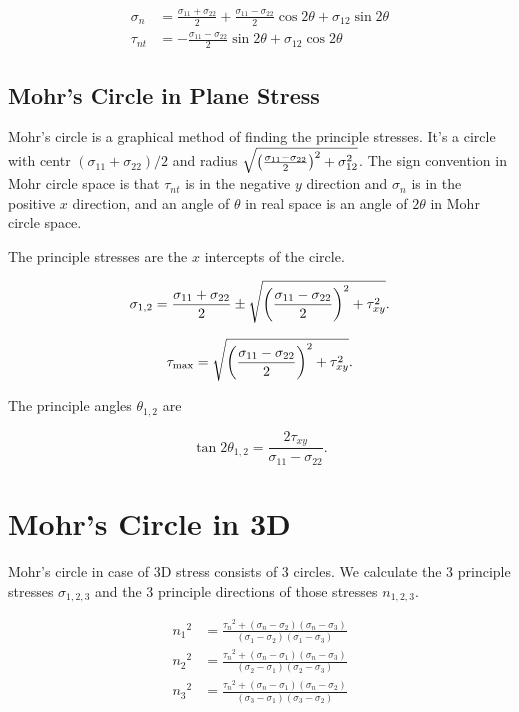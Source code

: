 \documentclass{report}
\begin{document}
\begin{align*}
	\sigma_n  & = \frac{\sigma_{11}+\sigma_{22}}{2} + \frac{\sigma_{11}-\sigma_{22}}{2}\cos2\theta + \sigma_{12}\sin2\theta \\
	\tau_{nt} & = -\frac{\sigma_{11}-\sigma_{22}}{2}\sin2\theta + \sigma_{12}\cos2\theta
\end{align*}

\subsection{Mohr's Circle in Plane Stress}

Mohr's circle is a graphical method of finding the principle stresses. It's a circle with centr $(\sigma_{11}+\sigma_{22})/2$ and radius $\sqrt{\left(\frac{\sigma_{11}-\sigma_{22}}{2}\right)^2 + \sigma_{12}^2}$. The sign convention in Mohr circle space is that $\tau_{nt}$ is in the negative $y$ direction and $\sigma_n$ is in the positive $x$ direction, and an angle of $\theta$ in real space is an angle of $2\theta$ in Mohr circle space.

The principle stresses are the $x$ intercepts of the circle.

\[
	\sigma_{1,2} = \frac{\sigma_{11}+\sigma_{22}}{2} \pm \sqrt{\left(\frac{\sigma_{11}-\sigma_{22}}{2}\right)^2 + \tau_{xy}^2}
	.\]

\[
	\tau_\text{max} = \sqrt{\left(\frac{\sigma_{11}-\sigma_{22}}{2}\right)^2 + \tau_{xy}^2}
	.\]

The principle angles $\theta_{1,2}$ are

\[
	\tan2\theta_{1,2} = \frac{2\tau_{xy}}{\sigma_{11}-\sigma_{22}}
	.\]

\section{Mohr's Circle in 3D}

Mohr's circle in case of 3D stress consists of 3 circles. We calculate the 3 principle stresses $\sigma_{1,2,3}$ and the 3 principle directions of those stresses $n_{1,2,3}$.

\begin{align*}
	{n_1}^2 & = \frac{{\tau_n}^2 + (\sigma_n - \sigma_2)(\sigma_n - \sigma_3)}{(\sigma_1 - \sigma_2)(\sigma_1-\sigma_3)} \\
	{n_2}^2 & = \frac{{\tau_n}^2 + (\sigma_n - \sigma_1)(\sigma_n - \sigma_3)}{(\sigma_2 - \sigma_1)(\sigma_2-\sigma_3)} \\
	{n_3}^2 & = \frac{{\tau_n}^2 + (\sigma_n - \sigma_1)(\sigma_n - \sigma_2)}{(\sigma_3 - \sigma_1)(\sigma_3-\sigma_2)}
\end{align*}
\end{document}
